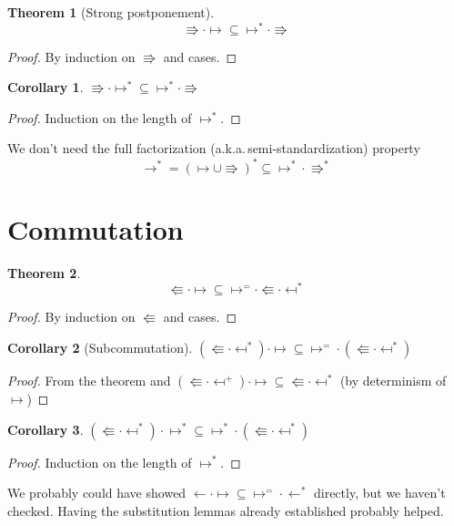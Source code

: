 \documentclass[a4paper, 11pt,titlepage, openright, twoside]{report}
\newcommand{\+}{\enspace}
\newtheorem{corollary}{Corollary}
\newtheorem{theorem}{Theorem}
\begin{document}
\begin{theorem}[Strong postponement]
	$${\Rrightarrow · ↦} ⊆ {↦^* · \Rrightarrow}$$
\end{theorem}
\begin{proof}
	By induction on $\Rrightarrow$ and cases.
\end{proof}
\begin{corollary}
	${\Rrightarrow · ↦^*} ⊆ {↦^* · \Rrightarrow}$
\end{corollary}
\begin{proof}
	Induction on the length of $↦^*$.
\end{proof}

We don't need the full factorization (a.k.a.\,semi-standardization) property
$$→^* = (↦ ∪ \Rrightarrow)^* ⊆ {↦^* · \Rrightarrow^*}$$

\section{Commutation}

\begin{theorem}
 \label{quasisubcomm}
	$${\Lleftarrow · ↦ } ⊆ {↦^= · \Lleftarrow · \mapsfrom^*}$$
\end{theorem}
\begin{proof}
	By induction on $\Lleftarrow$ and cases.
\end{proof}

\begin{corollary}[Subcommutation] \item
	${(\Lleftarrow · \mapsfrom^*) · ↦} ⊆ {↦^= \mathbin{·} ({{\Lleftarrow} · \mapsfrom^*})}$
\end{corollary}
\begin{proof}
	From the theorem %
	and
	${(\Lleftarrow · \mapsfrom^+) · ↦} ⊆ {{{\Lleftarrow} · \mapsfrom^*}}$ (by determinism of $↦$)
\end{proof}
\begin{corollary}
	${(\Lleftarrow · \mapsfrom^*) · ↦^*} ⊆ {↦^* \mathbin{·} ({{\Lleftarrow} · \mapsfrom^*})}$
\end{corollary}
\begin{proof}
	Induction on the length of $↦^*$.
\end{proof}

We probably could have showed ${← · ↦} ⊆ {↦^= · ←^*}$ directly, but we haven't checked.
Having the substitution lemmas already established probably helped.
\end{document}
